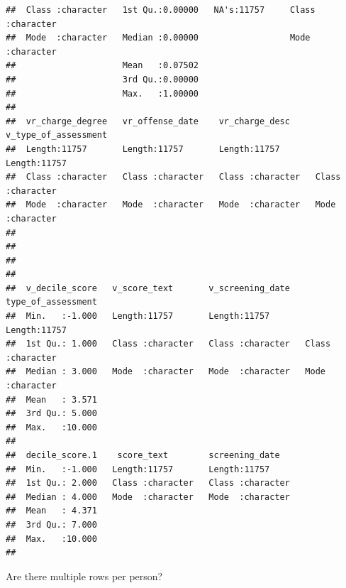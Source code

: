 \documentclass[
]{article}
\newenvironment{Shaded}{\begin{snugshade}}{\end{snugshade}}
\newcommand{\FunctionTok}[1]{\textcolor[rgb]{0.00,0.00,0.00}{#1}}
\newcommand{\NormalTok}[1]{#1}
\newcommand{\SpecialCharTok}[1]{\textcolor[rgb]{0.00,0.00,0.00}{#1}}
\begin{document}
\begin{verbatim}
##  Class :character   1st Qu.:0.00000   NA's:11757     Class :character  
##  Mode  :character   Median :0.00000                  Mode  :character  
##                     Mean   :0.07502                                    
##                     3rd Qu.:0.00000                                    
##                     Max.   :1.00000                                    
##                                                                        
##  vr_charge_degree   vr_offense_date    vr_charge_desc     v_type_of_assessment
##  Length:11757       Length:11757       Length:11757       Length:11757        
##  Class :character   Class :character   Class :character   Class :character    
##  Mode  :character   Mode  :character   Mode  :character   Mode  :character    
##                                                                               
##                                                                               
##                                                                               
##                                                                               
##  v_decile_score   v_score_text       v_screening_date   type_of_assessment
##  Min.   :-1.000   Length:11757       Length:11757       Length:11757      
##  1st Qu.: 1.000   Class :character   Class :character   Class :character  
##  Median : 3.000   Mode  :character   Mode  :character   Mode  :character  
##  Mean   : 3.571                                                           
##  3rd Qu.: 5.000                                                           
##  Max.   :10.000                                                           
##                                                                           
##  decile_score.1    score_text        screening_date    
##  Min.   :-1.000   Length:11757       Length:11757      
##  1st Qu.: 2.000   Class :character   Class :character  
##  Median : 4.000   Mode  :character   Mode  :character  
##  Mean   : 4.371                                        
##  3rd Qu.: 7.000                                        
##  Max.   :10.000                                        
## 
\end{verbatim}

Are there multiple rows per person?

\begin{Shaded}
\end{Shaded}
\end{document}
